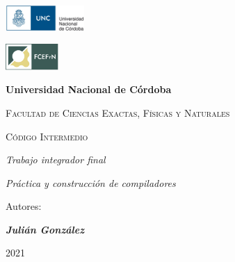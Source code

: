 \begin{titlepage}
    \centering
    {\includegraphics[width=0.225\textwidth]{../img/logo.jpg}}
    \hspace{1cm}
    {\includegraphics[width=0.15\textwidth]{../img/fcefyn.png}\par}
    \vspace{1cm}
    {\bfseries\LARGE Universidad Nacional de Córdoba \par}
    \vspace{0.7cm}
    {\scshape\Large Facultad de Ciencias Exactas, Físicas y Naturales\par}
    \vspace{2cm}
    {\scshape\Huge Código Intermedio \par}
    \vspace{3cm}
    {\itshape\Large Trabajo integrador final \par}
    \vspace{2cm}
    {\itshape\large Práctica y construcción de compiladores \par}
    \vfill
    \vspace{0.5cm}
    {\Large Autores: \par}
    \vspace{0.5cm}
    {\Large \textbf\emph{Julián González}\par}
    \vfill
    \vspace{0.2cm} 
    {\small 2021 \par}
\end{titlepage}


